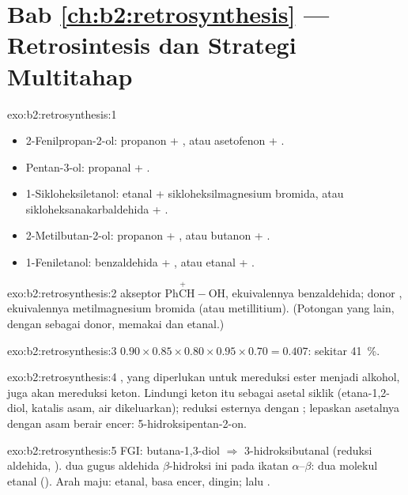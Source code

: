 \section*{Bab \ref{ch:b2:retrosynthesis} --- Retrosintesis dan Strategi Multitahap}

\begin{solution}{exo:b2:retrosynthesis:1}
\begin{itemize}
  \item 2-Fenilpropan-2-ol: propanon + , atau asetofenon + .
  \item Pentan-3-ol: propanal + .
  \item 1-Sikloheksiletanol: etanal + sikloheksilmagnesium bromida, atau
        sikloheksanakarbaldehida + .
  \item 2-Metilbutan-2-ol: propanon + , atau butanon + .
  \item 1-Feniletanol: benzaldehida + , atau etanal + .
\end{itemize}
\end{solution}

\begin{solution}{exo:b2:retrosynthesis:2}
 akseptor $\mathrm{Ph\overset{+}{C}H{-}OH}$, ekuivalennya benzaldehida;
 donor , ekuivalennya metilmagnesium bromida (atau
metillitium). (Potongan yang lain, dengan  sebagai donor, memakai
 dan etanal.)
\end{solution}

\begin{solution}{exo:b2:retrosynthesis:3}
$0.90 \times 0.85 \times 0.80 \times 0.95 \times 0.70 = 0.407$: sekitar 41~\%.
\end{solution}

\begin{solution}{exo:b2:retrosynthesis:4}
, yang diperlukan untuk mereduksi ester menjadi alkohol, juga
akan mereduksi keton. Lindungi keton itu sebagai asetal siklik (etana-1,2-diol,
katalis asam, air dikeluarkan); reduksi esternya dengan
; lepaskan asetalnya dengan asam berair encer: 5-hidroksipentan-2-on.
\end{solution}

\begin{solution}{exo:b2:retrosynthesis:5}
FGI: butana-1,3-diol $\Rightarrow$ 3-hidroksibutanal (reduksi aldehida,
).  dua gugus aldehida $\beta$-hidroksi ini pada ikatan
$\alpha$--$\beta$: dua molekul etanal (). Arah maju: etanal, basa encer,
dingin; lalu .
\end{solution}

